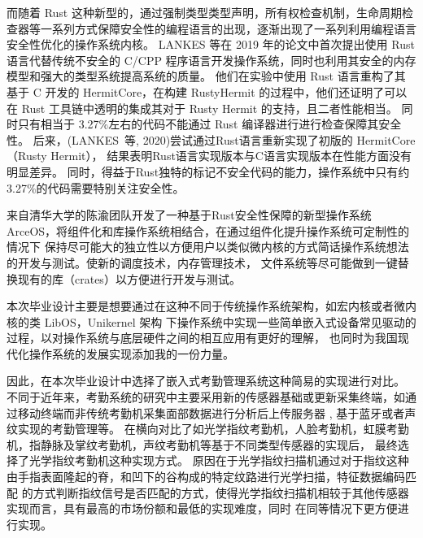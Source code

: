     而随着 Rust 这种新型的，通过强制类型类型声明，所有权检查机制，生命周期检查器等一系列方式保障安全性的编程语言的出现，逐渐出现了一系列利用编程语言安全性优化的操作系统内核。
    LANKES 等在 2019 年的论文中首次提出使用 Rust 语言代替传统不安全的 C/CPP 程序语言开发操作系统，同时也利用其安全的内存模型和强大的类型系统提高系统的质量。
    他们在实验中使用 Rust 语言重构了其基于 C 开发的 HermitCore，在构建 RustyHermit 的过程中，他们还证明了可以在 Rust 工具链中透明的集成其对于 Rusty Hermit 的支持，且二者性能相当。
    同时只有相当于 3.27\%左右的代码不能通过 Rust 编译器进行进行检查保障其安全性。
    \cite{lankes_exploring_2019, lankes_rustyhermit_2020}
    后来，(LANKES 等, 2020)尝试通过Rust语言重新实现了初版的 HermitCore（Rusty Hermit），
    结果表明Rust语言实现版本与C语言实现版本在性能方面没有明显差异。
    同时，得益于Rust独特的标记不安全代码的能力，操作系统中只有约3.27\%的代码需要特别关注安全性。


    来自清华大学的陈渝团队开发了一种基于Rust安全性保障的新型操作系统ArceOS，将组件化和库操作系统相结合，在通过组件化提升操作系统可定制性的情况下
    保持尽可能大的独立性以方便用户以类似微内核的方式简话操作系统想法的开发与测试。使新的调度技术，内存管理技术，
    文件系统等尽可能做到一键替换现有的库（crates）以方便进行开发与测试。

    本次毕业设计主要是想要通过在这种不同于传统操作系统架构，如宏内核或者微内核的类 LibOS，Unikernel 架构
    下操作系统中实现一些简单嵌入式设备常见驱动的过程，以对操作系统与底层硬件之间的相互应用有更好的理解，
    也同时为我国现代化操作系统的发展实现添加我的一份力量。

    因此，在本次毕业设计中选择了嵌入式考勤管理系统这种简易的实现进行对比。
    不同于近年来，考勤系统的研究中主要采用新的传感器基础或更新采集终端，如通过移动终端而非传统考勤机采集面部数据进行分析后上传服务器
    \cite{一种基于体征数据的考勤管理系统},
    基于蓝牙或者声纹实现的考勤管理等。
    \cite{一种基于体征数据的考勤管理系统, 李龙杰_2024_基于树莓派和声纹识别算法的课堂考勤系统, 一种基于蓝牙的无感考勤方法及系统}
    在横向对比了如光学指纹考勤机，人脸考勤机，虹膜考勤机，指静脉及掌纹考勤机，声纹考勤机等基于不同类型传感器的实现后，
    \cite{兰昊_2016_考勤系统现状综述}最终选择了光学指纹考勤机这种实现方式。
    原因在于光学指纹扫描机通过对于指纹这种由手指表面隆起的脊，和凹下的谷构成的特定纹路进行光学扫描，特征数据编码匹配
    的方式判断指纹信号是否匹配的方式，使得光学指纹扫描机相较于其他传感器实现而言，具有最高的市场份额和最低的实现难度，同时
    在同等情况下更方便进行实现。
    \cite{李兴春_2007_指纹考勤系统研究}

